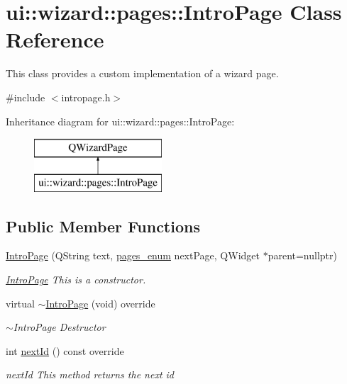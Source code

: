 \hypertarget{classui_1_1wizard_1_1pages_1_1_intro_page}{}\section{ui\+:\+:wizard\+:\+:pages\+:\+:Intro\+Page Class Reference}
\label{classui_1_1wizard_1_1pages_1_1_intro_page}


This class provides a custom implementation of a wizard page.  




{\ttfamily \#include $<$intropage.\+h$>$}

Inheritance diagram for ui\+:\+:wizard\+:\+:pages\+:\+:Intro\+Page\+:\begin{figure}[H]
\begin{center}
\leavevmode
\includegraphics[height=2.000000cm]{classui_1_1wizard_1_1pages_1_1_intro_page}
\end{center}
\end{figure}
\subsection*{Public Member Functions}
\begin{DoxyCompactItemize}
\item 
\mbox{\hyperlink{classui_1_1wizard_1_1pages_1_1_intro_page_ad984d57f77f15e89e82d1184c997b778}{Intro\+Page}} (Q\+String text, \mbox{\hyperlink{namespaceui_1_1wizard_1_1pages_a1a25c157e498474f0cf868944a52bf44}{pages\+\_\+enum}} next\+Page, Q\+Widget $\ast$parent=nullptr)
\begin{DoxyCompactList}\small\item\em \mbox{\hyperlink{classui_1_1wizard_1_1pages_1_1_intro_page}{Intro\+Page}} This is a constructor. \end{DoxyCompactList}\item 
virtual \mbox{\hyperlink{classui_1_1wizard_1_1pages_1_1_intro_page_ac83805abea5b47093cc0e3ff4c85abf3}{$\sim$\+Intro\+Page}} (void) override
\begin{DoxyCompactList}\small\item\em $\sim$\+Intro\+Page Destructor \end{DoxyCompactList}\item 
int \mbox{\hyperlink{classui_1_1wizard_1_1pages_1_1_intro_page_a210708d731eaca79e5c0d220c08ad739}{next\+Id}} () const override
\begin{DoxyCompactList}\small\item\em next\+Id This method returns the next id \end{DoxyCompactList}\end{DoxyCompactItemize}
